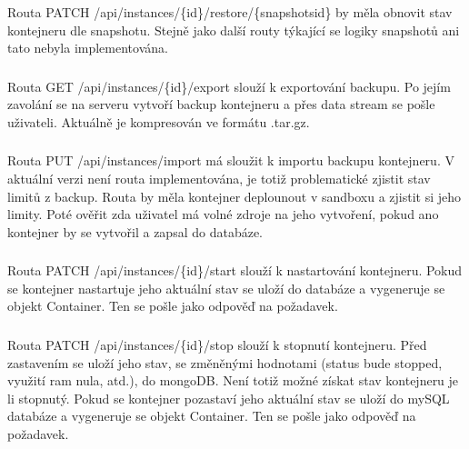 \documentclass[a4paper,oneside,12pt]{report}
\begin{document}
\subsubsection{}

Routa PATCH /api/instances/\{id\}/restore/\{snapshotsid\} by měla obnovit stav kontejneru dle snapshotu.
Stejně jako další routy týkající se logiky snapshotů ani tato nebyla implementována.

\subsubsection{}

Routa GET /api/instances/\{id\}/export slouží k exportování backupu.
Po jejím zavolání se na serveru vytvoří backup kontejneru a přes data stream se pošle uživateli.
Aktuálně je kompresován ve formátu .tar.gz.

\subsubsection{\color{apiyellow}{PUT -- /api/instances/import}}

Routa PUT /api/instances/import má sloužit k importu backupu kontejneru.
V aktuální verzi není routa implementována, je totiž problematické zjistit stav limitů z backup.
Routa by měla kontejner deplounout v sandboxu a zjistit si jeho limity.
Poté ověřit zda uživatel má volné zdroje na jeho vytvoření, pokud ano kontejner by se vytvořil a zapsal do databáze.


\subsubsection{}

Routa PATCH  /api/instances/\{id\}/start slouží k nastartování kontejneru.
Pokud se kontejner nastartuje jeho aktuální stav se uloží do databáze a vygeneruje se objekt Container.
Ten se pošle jako odpověď na požadavek.

\subsubsection{}

Routa PATCH  /api/instances/\{id\}/stop slouží k stopnutí kontejneru.
Před zastavením se uloží jeho stav, se změněnými hodnotami (status bude stopped, využití ram nula, atd.), do mongoDB.
Není totiž možné získat stav kontejneru je li stopnutý.
Pokud se kontejner pozastaví jeho aktuální stav se uloží do mySQL databáze a vygeneruje se objekt Container.
Ten se pošle jako odpověď na požadavek.
\end{document}
